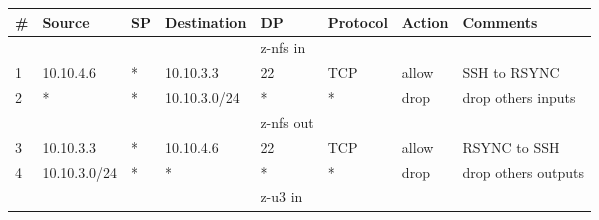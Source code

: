 \documentclass[a4paper, 11pt, oneside]{article}
\begin{document}
\begin{table}[H]
\begin{tabular}{|llllllll|}
  \hline
  \multicolumn{1}{|l|}{\textbf{\#}} & \multicolumn{1}{l|}{\textbf{Source}} & \multicolumn{1}{l|}{\textbf{SP}} & \multicolumn{1}{l|}{\textbf{Destination}} & \multicolumn{1}{l|}{\textbf{DP}} & \multicolumn{1}{l|}{\textbf{Protocol}} & \multicolumn{1}{l|}{\textbf{Action}} & \textbf{Comments}   \\ \hline
                                    &                                      &                                  &                                           & {\color[HTML]{FE0000} z-nfs in}  &                                        &                                      &                     \\ \hline
  \multicolumn{1}{|l|}{1}           & \multicolumn{1}{l|}{10.10.4.6}       & \multicolumn{1}{l|}{*}           & \multicolumn{1}{l|}{10.10.3.3}            & \multicolumn{1}{l|}{22}          & \multicolumn{1}{l|}{TCP}               & \multicolumn{1}{l|}{allow}           & SSH to RSYNC        \\ \hline
  \multicolumn{1}{|l|}{2}           & \multicolumn{1}{l|}{*}               & \multicolumn{1}{l|}{*}           & \multicolumn{1}{l|}{10.10.3.0/24}         & \multicolumn{1}{l|}{*}           & \multicolumn{1}{l|}{*}                 & \multicolumn{1}{l|}{drop}            & drop others inputs  \\ \hline
                                    &                                      &                                  &                                           & {\color[HTML]{FE0000} z-nfs out} &                                        &                                      &                     \\ \hline
  \multicolumn{1}{|l|}{3}           & \multicolumn{1}{l|}{10.10.3.3}       & \multicolumn{1}{l|}{*}           & \multicolumn{1}{l|}{10.10.4.6}            & \multicolumn{1}{l|}{22}          & \multicolumn{1}{l|}{TCP}               & \multicolumn{1}{l|}{allow}           & RSYNC to SSH        \\ \hline
  \multicolumn{1}{|l|}{4}           & \multicolumn{1}{l|}{10.10.3.0/24}    & \multicolumn{1}{l|}{*}           & \multicolumn{1}{l|}{*}                    & \multicolumn{1}{l|}{*}           & \multicolumn{1}{l|}{*}                 & \multicolumn{1}{l|}{drop}            & drop others outputs \\ \hline
                                    &                                      &                                  &                                           & {\color[HTML]{FE0000} z-u3 in}   &                                        &                                      &                     \\ \hline

\end{tabular}
\end{table}
\end{document}
